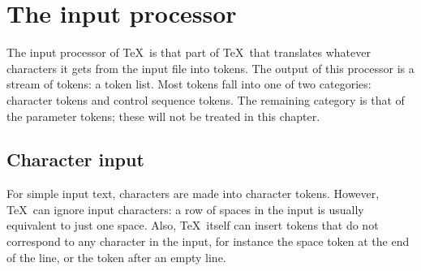 \documentclass{book}
\begin{document}
\section{The input processor}

The input processor of \TeX\ is that part of \TeX\ that
translates whatever characters it gets from the input file
into tokens. The output of this processor is a stream
of tokens: a token list. Most tokens fall into one of two categories:
character tokens and control sequence tokens. 
The remaining category is that of the parameter tokens;
these will not be treated in this chapter.

\subsection{Character input}

For simple input text, characters are made into
character tokens. However, \TeX\ can ignore input characters:
a row of spaces in the input is usually equivalent to just one
space. Also, \TeX\ itself can insert tokens that do not correspond
to any character in the input, for instance the space token
at the end of the line, or the  token after an empty line.
\end{document}
